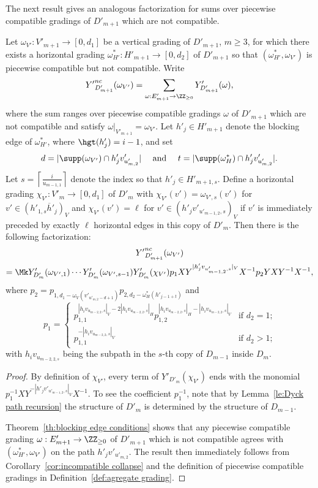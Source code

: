 The next result gives an analogous factorization for sums over piecewise compatible gradings of $D'_{m+1}$ which are not compatible.
\begin{lemma}
 \label{le:incompatible factorization 2}
 Let $\omega_{V'}:V'_{m+1}\to[0,d_1]$ be a vertical grading of $D'_{m+1}$, $m\ge3$, for which there exists a horizontal grading $\omega^*_{H'}:H'_{m+1}\to[0,d_2]$ of $D'_{m+1}$ so that $(\omega^*_{H'},\omega_{V'})$ is piecewise compatible but not compatible.
 Write 
 \[{Y'}_{D'_{m+1}}^{nc}(\omega_{V'})=\sum\limits_{\omega:E'_{m+1}\to\ZZ_{\ge0}}Y'_{D'_{m+1}}(\omega),\]
 where the sum ranges over piecewise compatible gradings $\omega$ of $D'_{m+1}$ which are not compatible and satisfy $\omega|_{V'_{m+1}}=\omega_{V'}$.
 Let $h'_j\in H'_{m+1}$ denote the blocking edge of $\omega^*_{H'}$, where $\hgt(h'_j)=i-1$, and set 
 \[d=|\supp(\omega_{V'})\cap h'_jv'_{u'_{m,2}}|\quad\text{ and }\quad t=|\supp(\omega^*_H)\cap h'_jv'_{u'_{m,2}}|.\]
 Let $s=\left\lceil\frac{i}{u_{m-1,1}}\right\rceil$ denote the index so that $h'_j\in H'_{m+1,s}$.
 Define a horizontal grading $\chi_{V'}:V'_m\to[0,d_1]$ of $D'_m$ with $\chi_{V'}(v')=\omega_{V',s}(v')$ for $v'\in (h'_{1,s}\overline{h}'_j)_V$ and $\chi_{V'}(v')=\ell$ for $v'\in (h'_jv'_{u'_{m-1,2},s})_V$ if $v'$ is immediately preceded by exactly $\ell$ horizontal edges in this copy of $D'_m$.
 Then there is the following factorization:
 \begin{multline}
 \label{eq:incompatible factorization 2}
 {Y'}_{D'_{m+1}}^{nc}(\omega_{V'})\\
 =\Mk Y'_{D'_m}(\omega_{V',1})\cdots Y'_{D'_m}(\omega_{V',s-1})Y'_{D'_m}(\chi_{V'})p_1XY^{|h'_jv_{u'_{m-1,2},s}|_V}X^{-1} p_2YXY^{-1}X^{-1},
 \end{multline}
 where $p_2=p_{1,d_1-\omega_V(v'_{u'_{m,2}-d+1})}p_{2,d_2-\omega^*_H(h'_{j-1+t})}$ and
 \[p_1=\begin{cases} p_{1,1}^{|h_iv_{u_{m-2,2},s}|_V-2|h_iv_{u_{m-2,2},s}|_H}p_{1,2}^{|h_iv_{u_{m-2,2},s}|_H-|h_iv_{u_{m-2,2},s}|_V} & \text{if $d_2=1$;}\\ 
 p_{1,1}^{-|h_iv_{u_{m-2,2},s}|_V} & \text{if $d_2>1$;}\end{cases}\]
 with $h_iv_{u_{m-2,2,s}}$ being the subpath in the $s$-th copy of $D_{m-1}$ inside $D_m$.
\end{lemma}
\begin{proof}
 By definition of $\chi_{V'}$, every term of $Y'_{D'_m}(\chi_{V'})$ ends with the monomial $p_1^{-1}XY^{-|h'_jv'_{u'_{m-1,2},s}|_V}X^{-1}$.
 To see the coefficient $p_1^{-1}$, note that by Lemma~\ref{le:Dyck path recursion} the structure of $D'_m$ is determined by the structure of $D_{m-1}$.

 Theorem~\ref{th:blocking edge conditions} shows that any piecewise compatible grading $\omega:E'_{m+1}\to\ZZ_{\ge0}$ of $D'_{m+1}$ which is not compatible agrees with $(\omega^*_{H'},\omega_{V'})$ on the path $h'_jv'_{u'_{m,2}}$.
 The result then immediately follows from Corollary~\ref{cor:incompatible collapse} and the definition of piecewise compatible gradings in Definition~\ref{def:agregate grading}.
\end{proof}


